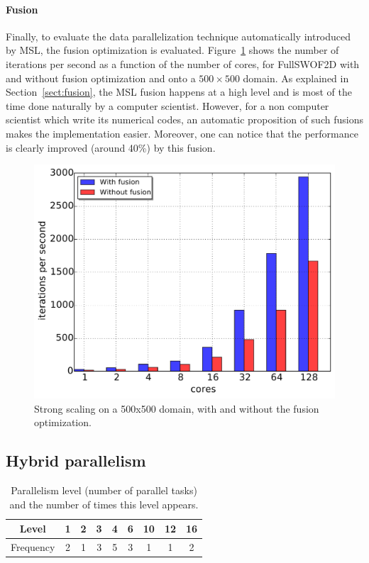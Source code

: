 \paragraph{\textbf{Fusion}} Finally, to evaluate the data parallelization technique automatically introduced by MSL, the fusion optimization is evaluated.
Figure~\ref{fig:fusion} shows the number of iterations per second as a function of the number of cores, for FullSWOF2D with and without fusion optimization and onto a $500 \times 500$ domain. As explained in Section~\ref{sect:fusion}, the MSL fusion happens at a high level and is most of the time done naturally by a computer scientist. However, for a non computer scientist which write its numerical codes, an automatic proposition of such fusions makes the implementation easier. Moreover, one can notice that the performance is clearly improved (around 40\%) by this fusion.

\begin{figure}[!h]\begin{center}
  \includegraphics[width=.6\textwidth]{../IJPP/results/task_scaling/500_200/fusVSbase.pdf}
  \caption{Strong scaling on a 500x500 domain, with and without the fusion optimization.}
  \label{fig:fusion}
\end{center}\end{figure}

\subsection{Hybrid parallelism}

\begin{table}[th]
 \begin{center}
 \begin{tabular}{|c|c|c|c|c|c|c|c|c|}
    \hline 
   Level & 1 & 2 & 3 & 4 & 6 & 10 & 12 & 16\\
   \hline
   Frequency & 2 & 1 & 3 & 5 & 3 & 1 & 1 & 2\\
   \hline
 \end{tabular}
\caption{Parallelism level (number of parallel tasks) and the number of times this level appears.}
\label{fig:freq}
 \end{center}
\end{table}

